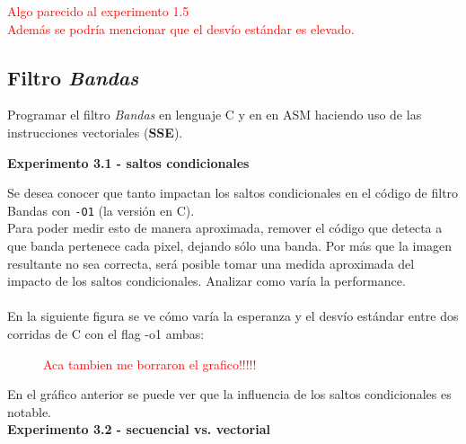 \textcolor{red}{Algo parecido al experimento 1.5 \\
Adem\'as se podr\'ia mencionar que el desv\'io est\'andar es elevado.}


\newpage

\subsection{Filtro \textit{Bandas}}

Programar el filtro \textit{Bandas} en lenguaje C y en en ASM haciendo uso de 
las instrucciones vectoriales (\textbf{SSE}).

\vspace*{0.3cm} \noindent
\textbf{Experimento 3.1 - saltos condicionales}

Se desea conocer que tanto impactan los saltos condicionales en el código 
de filtro Bandas con \verb|-O1| (la versión en C).\\
Para poder medir esto de manera aproximada, remover el código
que detecta a que banda pertenece cada pixel, dejando
sólo una banda.
Por más que la imagen resultante no sea correcta, será posible tomar una
medida aproximada del impacto de los saltos condicionales.
Analizar como varía la performance. \\
\\
En la siguiente figura se ve c\'omo var\'ia la esperanza y el desv\'io est\'andar entre dos corridas de C con el flag -o1 ambas:

\begin{figure}[h!]
  \begin{center}
    \textcolor{red}{Aca tambien me borraron el grafico!!!!!}
  \end{center}
\end{figure}

En el gr\'afico anterior se puede ver que la influencia de los saltos condicionales es notable. \\

\bigskip
\vspace*{0.3cm} \noindent
\textbf{Experimento 3.2 - secuencial vs. vectorial}

